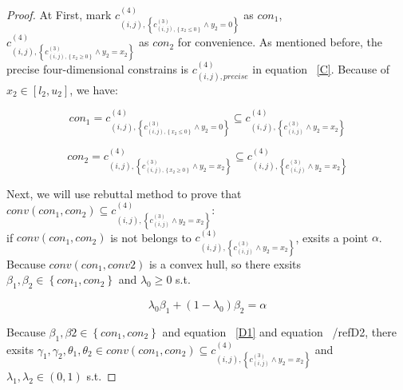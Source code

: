 \documentclass[runningheads]{llncs}
\begin{document}

\begin{proof}
At First, mark $c_{\left ( i,j\right ),\left \{ c^{(3)}_{\left ( i,j\right ),\left \{x_{2}\leq 0\right \}}\wedge y_{2}=0\right \}}^{(4)}$ as $con_{1}$, $c_{\left ( i,j\right ),\left \{ c^{(3)}_{\left ( i,j\right ),\left \{x_{2}\geq 0\right \}}\wedge y_{2}=x_{2}\right \}}^{(4)}$ as $con_{2}$ for convenience. As mentioned before, the precise four-dimensional constrains is $c_{\left ( i,j\right ),precise}^{(4)}$ in equation ~\ref{C}. Because of $x_{2}\in \left [ l_{2},u_{2}\right ]$, we have:

\begin{equation}\label{D}
con_{1}=c_{\left ( i,j\right ),\left \{ c^{(3)}_{\left ( i,j\right ),\left \{x_{2}\leq 0\right \}}\wedge y_{2}=0\right \}}^{(4)}\subseteq c_{\left ( i,j\right ),\left \{ c^{(3)}_{\left ( i,j\right )}\wedge y_{2}=x_{2}\right \}}^{(4)}
\end{equation}

\begin{equation}\label{D1}
con_{2}=c_{\left ( i,j\right ),\left \{ c^{(3)}_{\left ( i,j\right ),\left \{x_{2}\geq 0\right \}}\wedge y_{2}=x_{2}\right \}}^{(4)}\subseteq c_{\left ( i,j\right ),\left \{ c^{(3)}_{\left ( i,j\right )}\wedge y_{2}=x_{2}\right \}}^{(4)}
\end{equation}

Next, we will use rebuttal method to prove that $conv(con_{1},con_{2})\subseteq c_{\left ( i,j\right ),\left \{ c^{(3)}_{\left ( i,j\right )}\wedge y_{2}=x_{2}\right \}}^{(4)}$:\\

if $conv\left (con_{1},con_{2}\right )$ is not belongs to $c_{\left ( i,j\right ),\left \{ c^{(3)}_{\left ( i,j\right )}\wedge y_{2}=x_{2}\right \}}^{(4)}$, exsits a point $\alpha$. Because $conv(con_{1},conv{2})$ is a convex hull, so there exsits $\beta_{1},\beta_{2}\in \left \{con_{1},con_{2}\right \}$ and $\lambda_{0} \geq 0$ s.t.

\begin{equation}\label{D2}
\lambda_{0}\beta_{1} + (1-\lambda_{0})\beta_{2} = \alpha
\end{equation}

Because $\beta_{1},\beta{2}\in \left \{con_{1},con_{2}\right \}$ and equation ~\ref{D1} and equation ~/ref{D2}, there exsits $\gamma_{1},\gamma_{2},\theta_{1},\theta_{2}\in conv(con_{1},con_{2})\subseteq c_{\left ( i,j\right ),\left \{ c^{(3)}_{\left ( i,j\right )}\wedge y_{2}=x_{2}\right \}}^{(4)}$ and $\lambda_{1},\lambda_{2}\in \left ( 0,1\right )$ s.t.


\end{proof}
\end{document}

